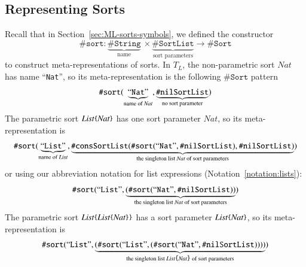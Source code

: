 \documentclass[UTF8,11pt]{article}
\theoremstyle{plain}
\theoremstyle{definition}
\theoremstyle{remark}
\newcommand{\Nat}{\textit{Nat}}
\newcommand{\List}{\textit{List}}
\newcommand{\parametric}[2]{{#1}\raisebox{.2ex}{\texttt{\footnotesize{\{}}}#2\raisebox{.2ex}{\texttt{\footnotesize{\}}}}}
\newcommand{\sharpsymbol}{\#}
\newcommand{\KString}{\texttt{\sharpsymbol String}}
\newcommand{\KSort}{\texttt{\sharpsymbol Sort}}
\newcommand{\Ksort}{\texttt{\sharpsymbol sort}}
\newcommand{\KSortList}{\texttt{\sharpsymbol SortList}}
\newcommand{\KnilKSortList}{\texttt{\sharpsymbol nilSortList}}
\newcommand{\KconsKSortList}{\texttt{\sharpsymbol consSortList}}
\newcommand{\qquottt}[1]{\textrm{``\texttt{#1}''}}
\begin{document}
\subsection{Representing Sorts}
\label{sec:represent-sorts}


Recall that in Section~\ref{sec:ML-sorts-symbols}, we defined the constructor
$$
\Ksort \colon \underbrace{\KString}_\text{name}\  \times
\underbrace{\KSortList}_\text{sort parameters} \to \KSort
$$
to construct meta-representations of sorts.
In $T_L$, the non-parametric sort $\Nat$ has name \qquottt{Nat},
so its meta-representation is the following $\KSort$ pattern
$$
\Ksort(
 \underbrace{\qquottt{Nat}}_\text{name of $\Nat$},
 \underbrace{\KnilKSortList}_\text{no sort parameter})
$$
The parametric sort $\parametric{\List}{\Nat}$ has one sort parameter $\Nat$,
so its meta-representation is
$$
\Ksort(
 \underbrace{
  \qquottt{List}}_
  \text{name of $\List$},
 \underbrace{
  \KconsKSortList(\Ksort(\qquottt{Nat}, \KnilKSortList),\KnilKSortList)}_
  \text{the singleton list $\Nat$ of sort parameters})
$$
or using our abbreviation notation for list expressions
(Notation~\ref{notation:lists}):
$$
 \Ksort(
  \qquottt{List},
  \underbrace{(\Ksort(\qquottt{Nat},\KnilKSortList))}_
   \text{the singleton list $\Nat$ of sort parameters})
$$
The parametric sort $\parametric{\List}{\parametric{\List}{\Nat}}$ has a sort
parameter $\parametric{\List}{\Nat}$, so its
meta-representation is
$$ \Ksort(\qquottt{List}, \underbrace{(\Ksort(\qquottt{List},
(\Ksort(\qquottt{Nat},\KnilKSortList))))}_
 \text{the singleton list $\parametric{\List}{\Nat}$ of sort parameters})$$
\end{document}
